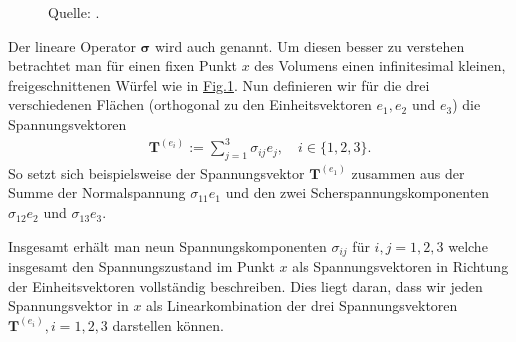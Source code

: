 \documentclass[letterpaper,10pt,english]{jupyterBook}
\let\sphinxpxdimen\pdfpxdimen\else\newdimen\sphinxpxdimen
\begin{document}
\begin{figure}[htbp]
\centering
\capstart

\noindent\sphinxincludegraphics[height=250\sphinxpxdimen]{{stress_tensor_comp}.png}
\caption{Quelle: .}\label{\detokenize{vektoranalysis/tensor:fig-stress-comp}}\end{figure}

\sphinxAtStartPar
Der lineare Operator \(\mathbf{\sigma}\) wird auch  genannt.
Um diesen besser zu verstehen betrachtet man für einen fixen Punkt \(x\) des Volumens einen infinitesimal kleinen, freigeschnittenen Würfel wie in \hyperref[\detokenize{vektoranalysis/tensor:fig-stress-comp}]{Fig.\@ \ref{\detokenize{vektoranalysis/tensor:fig-stress-comp}}}.
Nun definieren wir für die drei verschiedenen Flächen (orthogonal zu den Einheitsvektoren \(e_1, e_2\) und \(e_3\)) die Spannungsvektoren
\begin{equation*}
\begin{split}\mathbf{T}^{(e_i)}:= \sum_{j=1}^3 \sigma_{ij} e_j, \quad i \in \lbrace 1,2,3 \rbrace.\end{split}
\end{equation*}
\sphinxAtStartPar
So setzt sich beispielsweise der Spannungsvektor \(\mathbf{T}^{(e_1)}\) zusammen aus der Summe der Normalspannung \(\sigma_{11} e_1\) und den zwei Scherspannungskomponenten \(\sigma_{12} e_2\) und \(\sigma_{13} e_3\).

\sphinxAtStartPar
Insgesamt erhält man neun Spannungskomponenten \(\sigma_{ij}\) für \(i,j=1,2,3\) welche insgesamt den Spannungszustand im Punkt \(x\) als Spannungsvektoren in Richtung der Einheitsvektoren vollständig beschreiben.
Dies liegt daran, dass wir jeden Spannungsvektor in \(x\) als Linearkombination der drei Spannungsvektoren \(\mathbf{T}^{(e_i)}, i=1,2,3\) darstellen können.
\end{document}
